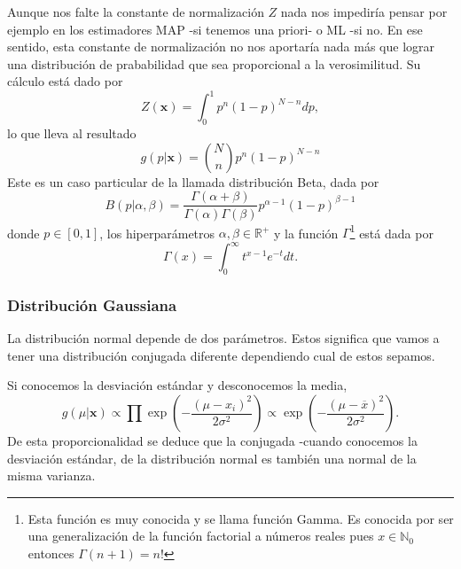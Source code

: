 Aunque nos falte la constante de normalización $Z$ nada nos impediría pensar por ejemplo en los estimadores MAP -si tenemos una priori- o ML -si no. En ese sentido, esta constante de normalización no nos aportaría nada más que lograr una distribución de prababilidad que sea proporcional a la verosimilitud. Su cálculo está dado por
\begin{equation}
    Z(\mathbf{x}) = \int_0^1 p^{n}(1-p)^{N-n}dp,
\end{equation}
lo que lleva al resultado
\begin{equation}
    g(p|\mathbf{x}) = \binom{N}{n}p^n(1-p)^{N-n}
\end{equation}
Este es un caso particular de la llamada distribuci\'on Beta, dada por
\begin{equation}
    B(p|\alpha,\beta) = \frac{\Gamma(\alpha+\beta)}{\Gamma(\alpha)\Gamma(\beta)}p^{\alpha-1}(1-p)^{\beta-1}
\end{equation}
donde $p\in[0,1]$, los hiperpar\'ametros $\alpha,\beta\in\mathbb{R}^+$ y la funci\'on $\Gamma$\footnote{Esta funci\'on es muy conocida y se llama funci\'on Gamma. Es conocida por ser una generalizaci\'on de la funci\'on factorial a n\'umeros reales pues $x\in\mathbb{N}_0$ entonces $\Gamma(n+1) = n!$} est\'a dada por
\begin{equation}
    \Gamma(x) = \int_0^\infty t^{x-1}e^{-t}dt.
\end{equation}
\subsubsection{Distribución Gaussiana}
La distribuci\'on normal depende de dos par\'ametros. Estos significa que vamos a tener una distribuci\'on conjugada diferente dependiendo cual de estos sepamos.

Si conocemos la desviaci\'on est\'andar y desconocemos la media,
\begin{equation}
    g(\mu|\mathbf{x}) \propto \prod \exp\left( - \frac{(\mu-x_i)^2}{2\sigma^2}\right)\propto \exp \left(- \frac{(\mu-\overline{x})^2}{2\sigma^2} \right).
\end{equation}
De esta proporcionalidad se deduce que la conjugada -cuando conocemos la desviaci\'on est\'andar, de la distribuci\'on normal es tambi\'en una normal de la misma varianza.

